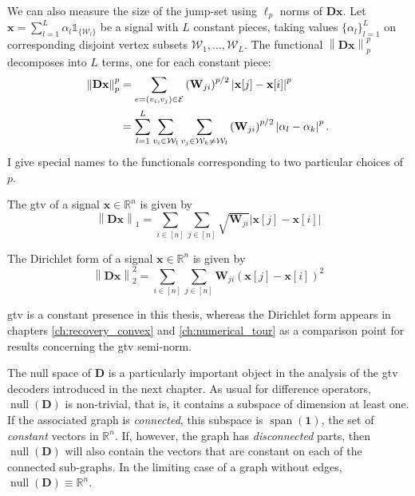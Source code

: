 We can also measure the size of the jump-set using $\ell_p$ norms of $\mathbf{Dx}$. Let $\mathbf{x} = \sum_{l=1}^{L} \alpha_l \mathbb{1}_{\{ \mathcal{W}_l \}}$ be a signal with $L$ constant pieces, taking values $\{ \alpha_l \}_{l=1}^{L}$ on corresponding disjoint vertex subsets $\mathcal{W}_1, \dots, \mathcal{W}_L$. The functional $\left \| \mathbf{D x} \right \|_p^p$ decomposes into $L$ terms, one for each constant piece:
\begin{align}
    \left \| \mathbf{D x} \right \|_p^p & = \sum_{e = (v_i,v_j) \in \mathcal{E}} \left(\mathbf{W}_{ji}\right)^{p/2} \left | \mathbf{x}[j] - \mathbf{x}[i] \right |^p \\
    & = \sum_{l=1}^{L} \sum_{v_i \in \mathcal{W}_l} \sum_{v_j \in \mathcal{W}_k \neq \mathcal{W}_l} \left(\mathbf{W}_{ji}\right)^{p/2} \left | \alpha_l - \alpha_k \right |^p. \nonumber
\end{align}
I give special names to the functionals corresponding to two particular choices of $p$.

\begin{definition}
    The \acrlong{gtv} of a signal $\mathbf{x} \in \mathbb{R}^{n}$ is given by
    \begin{equation}
        \left \| \mathbf{D x} \right \|_1 = \sum_{i \in [n]} \sum_{j \in [n]} \sqrt{\mathbf{W}_{ji}} \left | \mathbf{x}[j] - \mathbf{x}[i] \right |
    \end{equation}
    \label{def:gtv}
\end{definition}

\begin{definition}
    The Dirichlet form of a signal $\mathbf{x} \in \mathbb{R}^{n}$ is given by
    \begin{equation}
        \left \| \mathbf{D x} \right \|_2^2 = \sum_{i \in [n]} \sum_{j \in [n]} \mathbf{W}_{ji} \left ( \mathbf{x}[j] - \mathbf{x}[i] \right )^2
    \end{equation}
    \label{def:dirichlet_form}
\end{definition}

\acrlong{gtv} is a constant presence in this thesis, whereas the Dirichlet form appears in chapters \ref{ch:recovery_convex} and \ref{ch:numerical_tour} as a comparison point for results concerning the \acrshort{gtv} semi-norm.

The null space of $\mathbf{D}$ is a particularly important object in the analysis of the \acrshort{gtv} decoders introduced in the next chapter. As usual for difference operators, $\operatorname{null} \left ( \mathbf{D} \right )$ is non-trivial, that is, it contains a subspace of dimension at least one. If the associated graph is \emph{connected}, this subspace is $\operatorname{span}(\mathbf{1})$, the set of \emph{constant} vectors in $\mathbb{R}^{n}$. If, however, the graph has \emph{disconnected} parts, then $\operatorname{null} \left ( \mathbf{D} \right )$ will also contain the vectors that are constant on each of the connected sub-graphs. In the limiting case of a graph without edges, $\operatorname{null} \left ( \mathbf{D} \right ) \equiv \mathbb{R}^{n}$.


